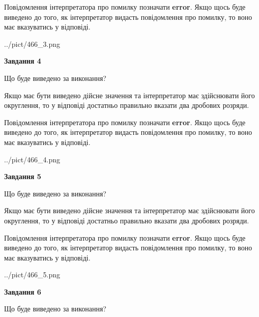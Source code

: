 \documentclass[12pt, ukrainian]{article}
\begin{document}
{\begin {Large}
Повідомлення інтерпретатора про помилку позначати \textbf{error}.
Якщо щось буде виведено до того, як інтерпретатор видасть повідомлення про помилку, 
то воно має вказуватись у відповіді. \par

\begin{center}
	{../pict/466_3.png}
\end{center}
\newpage

{\begin {center}\textbf{Завдання 4}\end {center}}\par
Що буде виведено за виконання? \par

Якщо має бути виведено дійсне значення та інтерпретатор має здійснювати його округлення, 
то у відповіді достатньо правильно вказати два дробових розряди.

Повідомлення інтерпретатора про помилку позначати \textbf{error}.
Якщо щось буде виведено до того, як інтерпретатор видасть повідомлення про помилку, 
то воно має вказуватись у відповіді. \par

\begin{center}
	{../pict/466_4.png}
\end{center}
\newpage

{\begin {center}\textbf{Завдання 5}\end {center}}\par
Що буде виведено за виконання? \par

Якщо має бути виведено дійсне значення та інтерпретатор має здійснювати його округлення, 
то у відповіді достатньо правильно вказати два дробових розряди.

Повідомлення інтерпретатора про помилку позначати \textbf{error}.
Якщо щось буде виведено до того, як інтерпретатор видасть повідомлення про помилку, 
то воно має вказуватись у відповіді. \par

\begin{center}
	{../pict/466_5.png}
\end{center}
\newpage

{\begin {center}\textbf{Завдання 6}\end {center}}\par
Що буде виведено за виконання? \par


\end{Large}}
\end{document}
